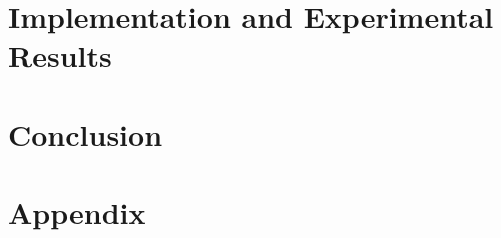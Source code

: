 \documentclass [
     12pt,         %
     a4paper,      %
     BCOR10mm,     %
     DIV14,        %
     liststotoc,   %
     bibtotoc,     %
     idxtotoc,     %
     parskip       %
     ]{scrreprt}
\begin{document}
\newpage


\chapter {Implementation and Experimental Results} \label{implementation}



\newpage


\chapter {Conclusion} \label{conclusion}



\newpage


\appendix 

\chapter{Appendix}



\newpage



\end{document}
